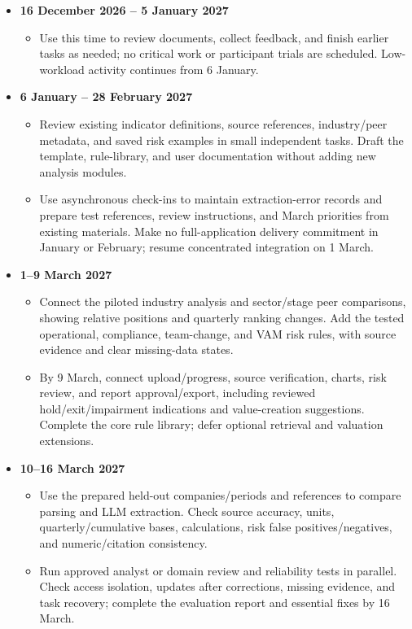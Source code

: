 \documentclass[a4paper,12pt]{article}
\begin{document}
\begin{itemize}
  \item \textbf{16 December 2026 -- 5 January 2027}
    \begin{itemize}
      \item Use this time to review documents, collect feedback, and finish earlier tasks as needed; no critical work or participant trials are scheduled. Low-workload activity continues from 6 January.
    \end{itemize}

  \item \textbf{6 January -- 28 February 2027}
    \begin{itemize}
      \item Review existing indicator definitions, source references, industry/peer metadata, and saved risk examples in small independent tasks. Draft the template, rule-library, and user documentation without adding new analysis modules.
      \item Use asynchronous check-ins to maintain extraction-error records and prepare test references, review instructions, and March priorities from existing materials. Make no full-application delivery commitment in January or February; resume concentrated integration on 1 March.
    \end{itemize}

  \item \textbf{1--9 March 2027}
    \begin{itemize}
      \item Connect the piloted industry analysis and sector/stage peer comparisons, showing relative positions and quarterly ranking changes. Add the tested operational, compliance, team-change, and VAM risk rules, with source evidence and clear missing-data states.
      \item By 9 March, connect upload/progress, source verification, charts, risk review, and report approval/export, including reviewed hold/exit/impairment indications and value-creation suggestions. Complete the core rule library; defer optional retrieval and valuation extensions.
    \end{itemize}

  \item \textbf{10--16 March 2027}
    \begin{itemize}
      \item Use the prepared held-out companies/periods and references to compare parsing and LLM extraction. Check source accuracy, units, quarterly/cumulative bases, calculations, risk false positives/negatives, and numeric/citation consistency.
      \item Run approved analyst or domain review and reliability tests in parallel. Check access isolation, updates after corrections, missing evidence, and task recovery; complete the evaluation report and essential fixes by 16 March.
    \end{itemize}


\end{itemize}
\end{document}
